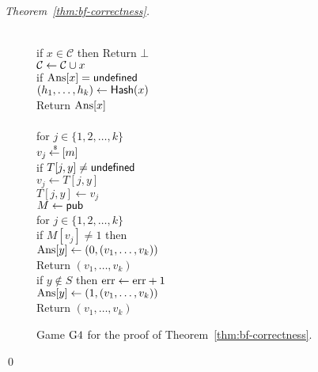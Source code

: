 \begin{proof}[Theorem~\ref{thm:bf-correctness}]
\begin{figure}[tp]
{{\\
if $x \in \mathcal{C}$ then Return $\bot$\\
${\cal C} \gets {\cal C} \cup x$\\
if $\mathrm{Ans}[x] = \mathsf{undefined}$\\
\nudge $(h_1, \ldots, h_{k}) \gets \mathsf{Hash}(x)$\\
Return $\mathrm{Ans}[x]$\\
%
}
{
\\
for $j \in \{1,2,\ldots,k\}$\\
\nudge $v_j {\:\stackrel{{\scriptscriptstyle \hspace{0.2em}\$}} {\leftarrow}\:} [m]$\\
\nudge if $T[j,y] \neq \mathsf{undefined}$\\
\nudge \nudge $v_j \gets T[j,y]$\\
\nudge $T[j,y] \gets v_j$\\
%
$M \gets{\sf pub}$\\
for $j \in \{1,2,\ldots,k\}$\\
\nudge if $M[v_j] \neq 1$ then \\
\nudge \nudge $\mathrm{Ans}[y] \gets (0, (v_1, \ldots, v_{k}) )$\\
\nudge \nudge Return $\left(v_1,\ldots,v_k\right)$\\
if $y \not\in S$ then $\mathrm{err} \gets \mathrm{err} +1$\\
$\mathrm{Ans}[y] \gets (1, (v_1, \ldots, v_{k}))$\\
Return $\left(v_1,\ldots,v_k\right)$ } } \caption{Game $\text{G4}$
for the proof of Theorem~\ref{thm:bf-correctness}. } \label{fig:bf-correctness-games2}
\end{figure}
\hfill\qed
\end{proof}

